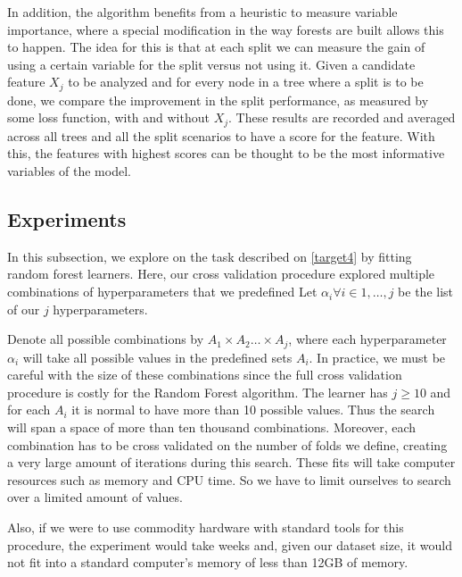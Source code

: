 
In addition, the algorithm benefits from a heuristic to measure variable importance, where a special modification in the way forests are built allows this to happen.
The idea for this is that at each split we can measure the gain of using a certain variable for the split versus not using it.
Given a candidate feature $X_j$ to be analyzed and for every node in a tree where a split is to be done, we compare the improvement in the split performance, as measured by some loss function, with and without $X_j$.
These results are recorded and averaged across all trees and all the split scenarios to have a score for the feature.
With this, the features with highest scores can be thought to be the most informative variables of the model.

\subsection{Experiments}\label{subsection:random_forests_experiments}

In this subsection, we explore on the task described on \cref{target4} by fitting random forest learners.
Here, our cross validation procedure explored multiple combinations of hyperparameters that we predefined Let $\alpha_i \forall i \in {1,\ldots,j}$ be the list of our $j$ hyperparameters.

Denote all possible combinations by $A_1 \times A_2 \ldots \times  A_j$, where each hyperparameter $\alpha_i$ will take all possible values in the predefined sets $A_i$.
In practice, we must be careful with the size of these combinations since the full cross validation procedure is costly for the Random Forest algorithm.
The learner has $j \geq 10$ and for each $A_i$ it is normal to have more than 10 possible values.
Thus the search will span a space of more than ten thousand combinations.
Moreover, each combination has to be cross validated on the number of folds we define, creating a very large amount of iterations during this search.
These fits will take computer resources such as memory and CPU time.
So we have to limit ourselves to search over a limited amount of values.

Also, if we were to use commodity hardware with standard tools for this procedure, the experiment would take weeks and, given our dataset size, it would not fit into a standard computer's memory of less than 12GB of memory.

